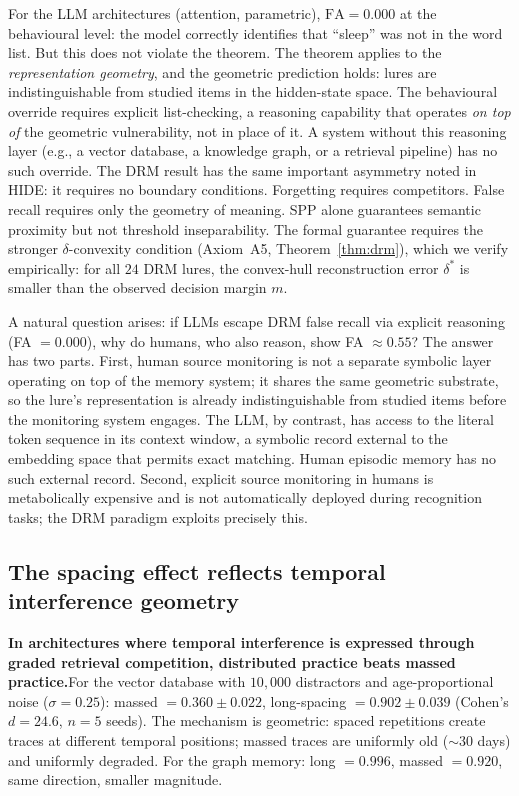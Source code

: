 \documentclass[11pt]{article}
\begin{document}
For the LLM architectures (attention, parametric), $\text{FA} = 0.000$ at the behavioural level: the model correctly identifies that ``sleep'' was not in the word list. But this does not violate the theorem. The theorem applies to the \textit{representation geometry}, and the geometric prediction holds: lures are indistinguishable from studied items in the hidden-state space. The behavioural override requires explicit list-checking, a reasoning capability that operates \textit{on top of} the geometric vulnerability, not in place of it. A system without this reasoning layer (e.g., a vector database, a knowledge graph, or a retrieval pipeline) has no such override. The DRM result has the same important asymmetry noted in HIDE: it requires no boundary conditions. Forgetting requires competitors. False recall requires only the geometry of meaning. SPP alone guarantees semantic proximity but not threshold inseparability. The formal guarantee requires the stronger $\delta$-convexity condition (Axiom~A5, Theorem~\ref{thm:drm}), which we verify empirically: for all $24$ DRM lures, the convex-hull reconstruction error $\delta^*$ is smaller than the observed decision margin $m$.

A natural question arises: if LLMs escape DRM false recall via explicit reasoning (FA $= 0.000$), why do humans, who also reason, show FA $\approx 0.55$? The answer has two parts. First, human source monitoring is not a separate symbolic layer operating on top of the memory system; it shares the same geometric substrate, so the lure's representation is already indistinguishable from studied items before the monitoring system engages. The LLM, by contrast, has access to the literal token sequence in its context window, a symbolic record external to the embedding space that permits exact matching. Human episodic memory has no such external record. Second, explicit source monitoring in humans is metabolically expensive and is not automatically deployed during recognition tasks; the DRM paradigm exploits precisely this.

\subsection*{The spacing effect reflects temporal interference geometry}

\noindent\textbf{In architectures where temporal interference is expressed through graded retrieval competition, distributed practice beats massed practice.}\quad For the vector database with $10{,}000$ distractors and age-proportional noise ($\sigma = 0.25$): massed $= 0.360 \pm 0.022$, long-spacing $= 0.902 \pm 0.039$ (Cohen's $d = 24.6$, $n = 5$ seeds). The mechanism is geometric: spaced repetitions create traces at different temporal positions; massed traces are uniformly old ($\sim 30$ days) and uniformly degraded. For the graph memory: long $= 0.996$, massed $= 0.920$, same direction, smaller magnitude.
\end{document}
